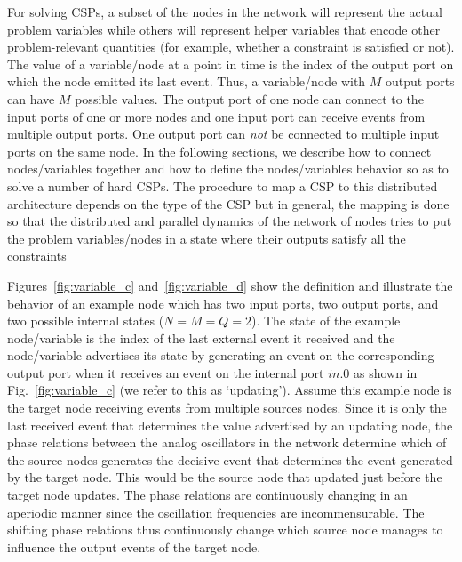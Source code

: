 \documentclass[10pt]{article}
\begin{document}
For solving CSPs, a subset of the nodes in the network will represent the actual problem variables while others will represent helper variables that encode other problem-relevant quantities (for example, whether a constraint is satisfied or not). The value of a variable/node at a point in time is the index of the output port on which the node emitted its last event. Thus, a variable/node with $M$ output ports can have $M$ possible values. The output port of one node can connect to the input ports of one or more nodes and one input port can receive events from multiple output ports. One output port can {\it not} be connected to multiple input ports on the same node. In the following sections, we describe how to connect nodes/variables together and how to define the nodes/variables behavior so as to solve a number of hard CSPs. The procedure to map a CSP to this distributed architecture depends on the type of the CSP but in general, the mapping is done so that the distributed and parallel dynamics of the network of nodes tries to put the problem variables/nodes in a state where their outputs satisfy all the constraints





Figures~\ref{fig:variable_c} and~\ref{fig:variable_d} show the definition and illustrate the behavior of an example node which has two input ports, two output ports, and two possible internal states ($N=M=Q=2$). The state of the example node/variable is the index of the last external event it received and the node/variable advertises its state by generating an event on the corresponding output port when it receives an event on the internal port $in.0$ as shown in Fig.~\ref{fig:variable_c} (we refer to this as `updating'). Assume this example node is the target node receiving events from multiple sources nodes. Since it is only the last received event that determines the value advertised by an updating node, the phase relations between the analog oscillators in the network determine which of the source nodes generates the decisive event that determines the event generated by the target node. This would be the source node that updated just before the target node updates. The phase relations are continuously changing in an aperiodic manner since the oscillation frequencies are incommensurable. The shifting phase relations thus continuously change which source node manages to influence the output events of the target node.
\end{document}
